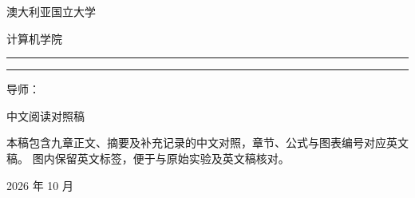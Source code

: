 \begin{titlepage}
\centering
{\Large 澳大利亚国立大学\par}
\vspace{0.5em}
{\large 计算机学院\par}
\vspace{2.0cm}
{\color{ThesisNavy}\rule{\linewidth}{1pt}\par}
\vspace{1em}
{\Large\bfseries\color{ThesisNavy}\thesistitle\par}
\vspace{1em}
{\color{ThesisNavy}\rule{\linewidth}{1pt}\par}
\vspace{1.4cm}
{\Large\thesisauthor\par}
\vspace{0.8cm}
{\large 导师：\thesissupervisor\par}
\vfill
{\large 中文阅读对照稿\par}
\vspace{0.6em}
\begin{minipage}{0.88\linewidth}
\small
本稿包含九章正文、摘要及补充记录的中文对照，章节、公式与图表编号对应英文稿。
图内保留英文标签，便于与原始实验及英文稿核对。
\end{minipage}\par
\vspace{1cm}
{\thesiscourse\par}
\vspace{0.7cm}
{2026 年 10 月\par}
\end{titlepage}
